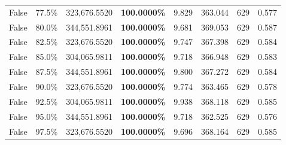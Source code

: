 \begin{table}[H]
\begin{tabular}{|m{}| m{}| r | R{0.13\textwidth}| R{0.09\textwidth}| R{0.09\textwidth}| R{0.09\textwidth}| R{0.11\textwidth}|}
False & 77.5\% & 323,676.5520 & \bfseries \color{red} 100.0000\% & 9.829 & 363.044 & 629 & 0.577 \\
False & 80.0\% & 344,551.8961 & \bfseries \color{red} 100.0000\% & 9.681 & 369.053 & 629 & 0.587 \\
False & 82.5\% & 323,676.5520 & \bfseries \color{red} 100.0000\% & 9.747 & 367.398 & 629 & 0.584 \\
False & 85.0\% & \color{red} 304,065.9811 & \bfseries \color{red} 100.0000\% & 9.718 & 366.948 & 629 & 0.583 \\
False & 87.5\% & 344,551.8961 & \bfseries \color{red} 100.0000\% & 9.800 & 367.272 & 629 & 0.584 \\
False & 90.0\% & 323,676.5520 & \bfseries \color{red} 100.0000\% & 9.774 & 363.465 & 629 & 0.578 \\
False & 92.5\% & \color{red} 304,065.9811 & \bfseries \color{red} 100.0000\% & 9.938 & 368.118 & 629 & 0.585 \\
False & 95.0\% & 344,551.8961 & \bfseries \color{red} 100.0000\% & 9.718 & 362.525 & 629 & 0.576 \\
False & 97.5\% & 323,676.5520 & \bfseries \color{red} 100.0000\% & 9.696 & 368.164 & 629 & 0.585 \\
\bottomrule
\end{tabular}
\end{table}
